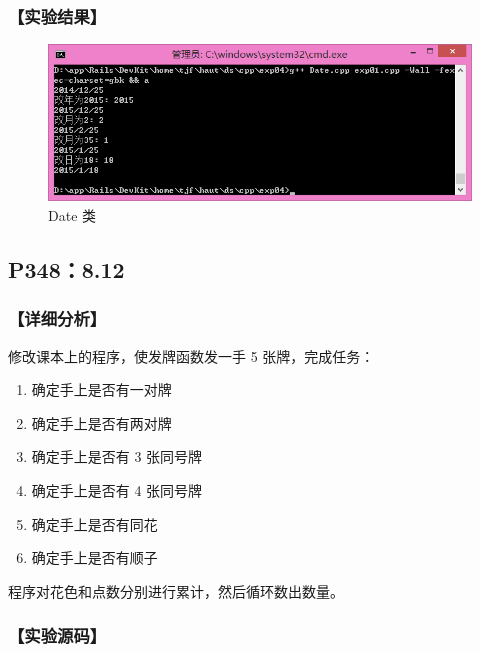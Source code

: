 \subsubsection*{【实验结果】}
\begin{figure}[htp]
\centering
\includegraphics[width=\textwidth]{exp04/exp01.png}
\caption{\label{out04_01}Date 类}
\end{figure}

\subsection{P348：8.12}
\subsubsection*{【详细分析】}
修改课本上的程序，使发牌函数发一手 5 张牌，完成任务：
\begin{enumerate}[topsep=0pt,partopsep=0pt,itemsep=0pt,parsep=0pt,label={\alph*)}]
\item 确定手上是否有一对牌
\item 确定手上是否有两对牌
\item 确定手上是否有 3 张同号牌
\item 确定手上是否有 4 张同号牌
\item 确定手上是否有同花
\item 确定手上是否有顺子
\end{enumerate}

程序对花色和点数分别进行累计，然后循环数出数量。
\subsubsection*{【实验源码】}
{\linespread{1}}
{\linespread{1}}
{\linespread{1}}
